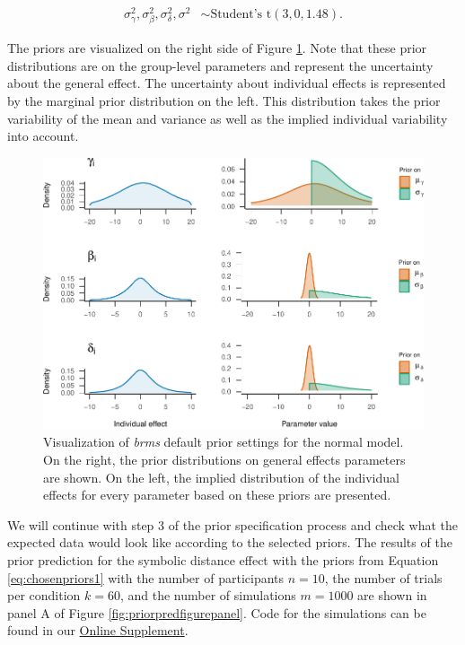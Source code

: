 \documentclass[
  english,
  doc,floatsintext]{apa6}
\begin{document}
\begin{equation}
\begin{aligned}
\sigma_{\gamma}^2, \sigma_{\beta}^2, \sigma_{\delta}^2, \sigma^2 &\sim \text{Student's t}(3, 0, 1.48). 
\end{aligned}
\end{equation}

The priors are visualized on the right side of Figure \ref{fig:priorvisualizationbrms2}. Note that these prior distributions are on the group-level parameters and represent the uncertainty about the general effect. The uncertainty about individual effects is represented by the marginal prior distribution on the left. This distribution takes the prior variability of the mean and variance as well as the implied individual variability into account.

\begin{figure}[H]

\includegraphics{manuscript_files/figure-latex/priorvisualizationbrms2-1} \hfill{}

\caption{Visualization of \textit{brms} default prior settings for the normal model. On the right, the prior distributions on general effects parameters are shown. On the left, the implied distribution of the individual effects for every parameter based on these priors are presented. }\label{fig:priorvisualizationbrms2}
\end{figure}

We will continue with step 3 of the prior specification process and check what the expected data would look like according to the selected priors. The results of the prior prediction for the symbolic distance effect with the priors from Equation \eqref{eq:chosenpriors1} with the number of participants \(n = 10\), the number of trials per condition \(k = 60\), and the number of simulations \(m = 1000\) are shown in panel A of Figure \ref{fig:priorpredfigurepanel}. Code for the simulations can be found in our \href{https://github.com/MyrtheV/Bayesian-Hierarchical-Modelling-An-Introduction-and-Reassessment}{Online Supplement}.
\end{document}
